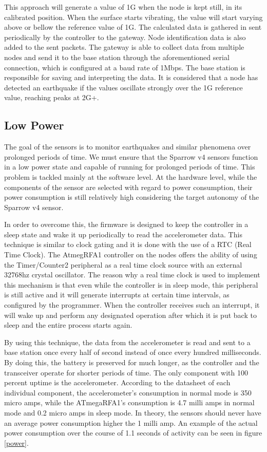 This approach will generate a value of 1G when the node is kept still, in its calibrated position. When the surface starts vibrating, the value will start varying 
above or bellow the reference value of 1G. The calculated data is gathered in sent periodically by the controller to the 
gateway. Node identification data is also added to the sent packets. The gateway is able to collect data from multiple nodes and send it to the base station through
the aforementioned serial connection, which is configured at a baud rate of 1Mbps. The base station is responsible for saving and interpreting the data. 
It is considered that a node has detected an earthquake if the values oscillate strongly over the 1G reference value, reaching peaks at 2G+.

\subsection{Low Power}

The goal of the sensors is to monitor earthquakes and similar phenomena over prolonged periods of time. We must ensure that the Sparrow v4 sensors function in a low power
state and capable of running for prolonged periods of time. This problem is tackled mainly at the software level. At the hardware level, while the components of the sensor 
are selected with regard to power consumption, their power consumption is still relatively high considering the target autonomy of the Sparrow v4 sensor.

In order to overcome this, the firmware is designed to keep the controller in a sleep state and wake it up periodically to read the accelerometer data. 
This technique is similar to clock gating and it is done with the use of a RTC (Real Time Clock). The AtmegRFA1 controller on the nodes offers the ability of using the Timer/Counter2 
peripheral as a real time clock source with an external 32768hz crystal oscillator. The reason why a real time clock is used to implement this mechanism is that even while the controller 
is in sleep mode, this peripheral is still active and it will generate interrupts at certain time intervals, as configured by the programmer. When the controller receives such an 
interrupt, it will wake up and perform any designated operation after which it is put back to sleep and the entire process starts again.

By using this technique, the data from the accelerometer is read and sent to a base station once every half of second instead of once every hundred milliseconds. By doing this, 
the battery is preserved for much longer, as the controller and the transceiver operate for shorter periods of time. The only component with 100 percent uptime is the 
accelerometer. According to the datasheet of each individual component, the accelerometer's consumption in normal mode is 350 micro amps, while the ATmegaRFA1's consumption is
4.7 milli amps in normal mode and 0.2 micro amps in sleep mode. In theory, the sensors should never have  an average power consumption higher the 1 milli amp. An example of the actual power consumption over the course of 1.1 seconds of activity can be seen in figure \ref{power}.

